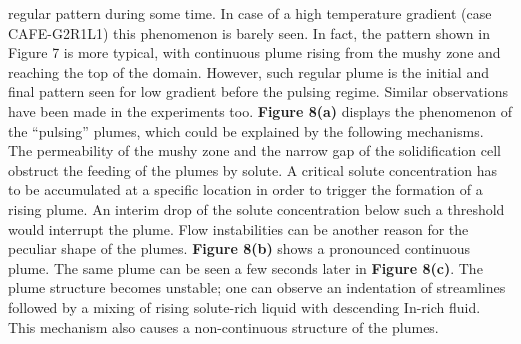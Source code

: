 regular pattern during some time. In case of a high temperature gradient (case CAFE-G2R1L1) this phenomenon is 
barely seen. In fact, the pattern shown in Figure 7 is more typical, with continuous plume rising from the mushy 
zone and reaching the top of the domain. However, such regular plume is the initial and final pattern seen for low 
gradient before the pulsing regime. Similar observations have been made in the experiments too. \textbf{Figure 8(a)} displays 
the phenomenon of the “pulsing” plumes, which could be explained by the following mechanisms. The permeability of the 
mushy zone and the narrow gap of the solidification cell obstruct the feeding of the plumes by solute. A critical solute 
concentration has to be accumulated at a specific location in order to trigger the formation of a rising plume. An interim 
drop of the solute concentration below such a threshold would interrupt the plume. Flow instabilities can be another reason 
for the peculiar shape of the plumes. \textbf{Figure 8(b)} shows a pronounced continuous plume. The same plume can be seen a few seconds 
later in \textbf{Figure 8(c)}. The plume structure becomes unstable; one can observe an indentation of streamlines followed by a mixing of 
rising solute-rich liquid with descending In-rich fluid. This mechanism also causes a non-continuous structure of the plumes.
%
